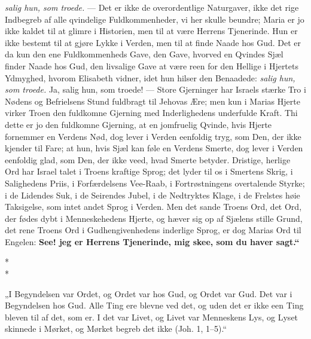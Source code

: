\documentclass[12pt,a4paper]{book}
\renewcommand{\thefootnote}{*)}
\begin{document}
\emph{salig hun, som troede.} --- Det er ikke de overordentlige Naturgaver, ikke
det rige Indbegreb af alle qvindelige Fuldkommenheder, vi her skulle beundre;
Maria er jo ikke kaldet til at glimre i Historien, men til at være Herrens
Tjenerinde. Hun er ikke bestemt til at gjøre Lykke i Verden, men til at finde
Naade hos Gud. Det er da kun den ene Fuldkommenheds Gave, den Gave, hvorved en
Qvindes Sjæl finder Naade hos Gud, den livsalige Gave at være reen for den
Hellige i Hjertets Ydmyghed,
hvorom Elisabeth vidner, idet hun hilser den Benaadede: \emph{salig hun, som
troede.} Ja, salig hun, som troede! --- Store Gjerninger har Israels stærke Tro
i Nødens og Befrielsens Stund fuldbragt til Jehovas Ære; men kun i Marias Hjerte
virker Troen den fuldkomne Gjerning med Inderlighedens underfulde Kraft. Thi
dette er jo den fuldkomne Gjerning, at en jomfruelig Qvinde, hvis Hjerte
fornemmer en Verdens Nød, dog lever i Verden eenfoldig tryg, som Den, der ikke
kjender til Fare; at hun, hvis Sjæl kan føle en Verdens Smerte, dog lever i
Verden eenfoldig glad, som Den, der ikke veed, hvad Smerte betyder. Dristige,
herlige Ord har Israel talet i Troens kraftige Sprog; det lyder til os i
Smertens Skrig, i Salighedens Priis, i Forfærdelsens Vee-Raab, i Fortrøstningens
overtalende Styrke; i de Lidendes Suk, i de Seirendes Jubel, i de Nedtryktes
Klage, i de Frelstes høie Taksigelse, som intet andet Sprog i Verden. Men det
sande Troens Ord, det Ord, der fødes dybt i Menneskehedens Hjerte, og hæver sig
op af Sjælens stille Grund, det rene Troens Ord i Gudhengivenhedens inderlige
Sprog, er dog Marias Ord til Engelen: \textbf{See! jeg er Herrens Tjenerinde,
mig skee, som du haver sagt.“}

\begin{center}
  *\quad*\\[-4pt]
  *
\end{center}

\begingroup\large
„I Begyndelsen var Ordet, og Ordet var hos Gud, og Ordet var Gud. Det var i
Begyndelsen hos Gud. Alle Ting ere blevne ved det, og uden det er ikke een Ting
bleven til af det, som er. I det var Livet, og Livet var Menneskens Lys, og
Lyset skinnede i Mørket, og Mørket begreb det ikke (Joh. 1, 1--5).“
\par\endgroup
\end{document}
